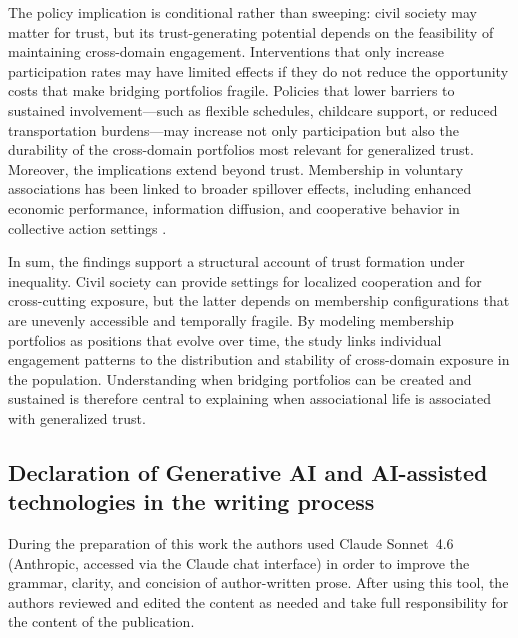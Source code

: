The policy implication is conditional rather than sweeping: civil society may matter for trust, but its trust-generating potential depends on the feasibility of maintaining cross-domain engagement. Interventions that only increase participation rates may have limited effects if they do not reduce the opportunity costs that make bridging portfolios fragile. Policies that lower barriers to sustained involvement—such as flexible schedules, childcare support, or reduced transportation burdens—may increase not only participation but also the durability of the cross-domain portfolios most relevant for generalized trust. Moreover, the implications extend beyond trust. Membership in voluntary associations has been linked to broader spillover effects, including enhanced economic performance, information diffusion, and cooperative behavior in collective action settings \parencite{audia_effect_2010}.

In sum, the findings support a structural account of trust formation under inequality. Civil society can provide settings for localized cooperation and for cross-cutting exposure, but the latter depends on membership configurations that are unevenly accessible and temporally fragile. By modeling membership portfolios as positions that evolve over time, the study links individual engagement patterns to the distribution and stability of cross-domain exposure in the population. Understanding when bridging portfolios can be created and sustained is therefore central to explaining when associational life is associated with generalized trust.

\subsection*{Declaration of Generative AI and AI-assisted technologies in the writing process}
During the preparation of this work the authors used Claude Sonnet~4.6 (Anthropic, accessed via the Claude chat interface) in order to improve the grammar, clarity, and concision of author-written prose. After using this tool, the authors reviewed and edited the content as needed and take full responsibility for the content of the publication.

\printbibliography

